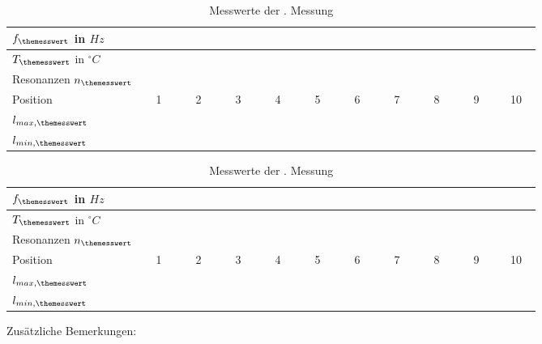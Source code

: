 \begin{table}[h!]
	\caption{Messwerte der {\themesswert}. Messung}
	\label{tab:messprotokoll->messung_3}
	\centering
	\begin{tabular}{|l|c|c|c|c|c|c|c|c|c|c|}
	\hline 
	$f_{\themesswert}$ in $Hz$ & \multicolumn{10}{c|}{~} \\ 
	\hline 
	$T_{\themesswert}$ in $^{\circ}C$ & \multicolumn{10}{c|}{~} \\ 
	\hline 
	Resonanzen $n_{\themesswert}$& \multicolumn{10}{c|}{~} \\ 
	\hline \rowcolor{secondcsvrow}
	Position & 1 & 2 & 3 & 4 & 5 & 6 & 7 & 8 & 9 & 10 \\ 
	\hline 
	$l_{max,{\themesswert}}$ & ~~~~~ & ~~~~~ & ~~~~~ & ~~~~~ & ~~~~~ & ~~~~~ & ~~~~~ & ~~~~~ & ~~~~~ & ~~~~~ \\ 
	\hline 
	$l_{min,{\themesswert}}$ & ~~~~~ & ~~~~~ & ~~~~~ & ~~~~~ & ~~~~~ & ~~~~~ & ~~~~~ & ~~~~~ & ~~~~~ & ~~~~~ \\
	\hline 
	\end{tabular} 	
\end{table}

\begin{table}[h!]
	\caption{Messwerte der {\themesswert}. Messung}
	\label{tab:messprotokoll->messung_4} 
	\centering
	\begin{tabular}{|l|c|c|c|c|c|c|c|c|c|c|}
	\hline 
	$f_{\themesswert}$ in $Hz$ & \multicolumn{10}{c|}{~} \\ 
	\hline 
	$T_{\themesswert}$ in $^{\circ}C$ & \multicolumn{10}{c|}{~} \\ 
	\hline 
	Resonanzen $n_{\themesswert}$& \multicolumn{10}{c|}{~} \\ 
	\hline \rowcolor{secondcsvrow}
	Position & 1 & 2 & 3 & 4 & 5 & 6 & 7 & 8 & 9 & 10 \\ 
	\hline 
	$l_{max,{\themesswert}}$ & ~~~~~ & ~~~~~ & ~~~~~ & ~~~~~ & ~~~~~ & ~~~~~ & ~~~~~ & ~~~~~ & ~~~~~ & ~~~~~ \\ 
	\hline 
	$l_{min,{\themesswert}}$ & ~~~~~ & ~~~~~ & ~~~~~ & ~~~~~ & ~~~~~ & ~~~~~ & ~~~~~ & ~~~~~ & ~~~~~ & ~~~~~ \\
	\hline 
	\end{tabular} 	
\end{table}
Zusätzliche Bemerkungen:
\newpage
{}